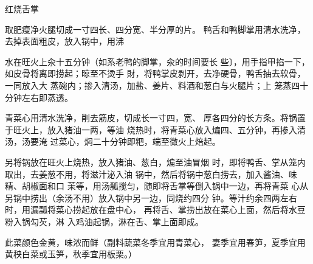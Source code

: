 \begin{recipe}{红烧舌掌}

\ingredients


\cooking

\step 取肥痩净火腿切成一寸四长、四分宽、半分厚的片。 鸭舌和鸭脚掌用清水洗净，去掉表面粗皮，放入锅中，用沸

水在旺火上汆十五分钟（如系老鸭的脚掌，汆的时间要长 些〕，用手指甲掐一下，如皮骨将离即捞起；晾至不烫手 財，将鸭掌皮剥开，去净硬骨，鸭舌抽去软骨，一同放入大 蒸碗内；掺入清汤，加盐、姜片、料酒和葱白与火腿片；上 笼蒸四十分钟左右即蒸透。

\step 青菜心用清水洗净，削去筋皮，切成长一寸四，宽、 厚各四分的长方条。将锅置于旺火上，放入猪油一两，等油 烧热时，将青菜心放入煸四、五分钟，再掺入清汤，汤要淹 过菜心，焖二十分钟即粑，端至微火上焙起。

另将锅放在旺火上烧热，放入猪油、葱白，煸至油冒烟 时，即将鸭舌、掌从笼内取出，去姜葱不用，将滋汁泌入油 锅中，然后将锅中葱白捞去，加入酱油、味精、胡椒面和口 茉等，用汤瓢搅匀，随即将舌掌等倒入锅中一边，再将青菜 心从另锅中捞出（余汤不用）放入锅中另一边，同烧约四分 钟。等汁约余四两左右时，用漏瓢将菜心捞起放在盘中心， 再将舌、掌捞出放在菜心上面，然后将水豆粉入锅勾芡，淋 入鸡油起锅，淋在舌、掌上面即成。

\notes

此菜颜色金黄，味浓而鲜（副料蔬菜冬季宜用青菜心， 妻季宜用春笋，夏季宜用黄秧白菜或玉笋，秋季宜用板栗。）

\end{recipe}

